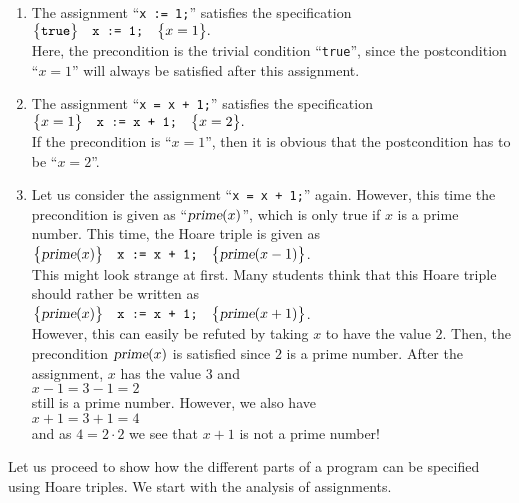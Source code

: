 \examples
\begin{enumerate}
\item The assignment ``\texttt{x := 1;}'' satisfies the specification
      \\[0.2cm]
      \hspace*{1.3cm}
      $ \bigl\{\mathtt{true}\bigr\}\quad\texttt{x := 1;}\quad\bigl\{x = 1\bigr\}. $
      \\[0.2cm]
      Here, the precondition is the trivial condition ``\texttt{true}'', since
      the postcondition ``$x = 1$'' will always be satisfied after this assignment.
\item The assignment  ``\texttt{x = x + 1;}'' satisfies the specification
      \\[0.2cm]
      \hspace*{1.3cm}
      $ \bigl\{x=1\bigr\}\quad\texttt{x := x + 1;}\quad\bigl\{x=2\bigr\}. $
      \\[0.2cm]
      If the precondition is ``$x = 1$'', then it is obvious that the postcondition has to be  
      ``$x = 2$''.
\item Let us consider the assignment ``\texttt{x = x + 1;}'' again.  However, this time
      the precondition is given as ``$\textsl{prime}(x)$'', which is only true if $x$ is a
      prime number.  This time, the Hoare triple is given as
      \\[0.2cm]
      \hspace*{1.3cm}
      $ \bigl\{\textsl{prime}(x)\bigr\}\quad\texttt{x := x + 1;}\quad\bigl\{\textsl{prime}(x-1)\bigr\}$.
      \\[0.2cm]
      This might look strange at first.  Many students think that this Hoare triple should rather
      be written as
      \\[0.2cm]
      \hspace*{1.3cm}
      $ \bigl\{\textsl{prime}(x)\bigr\}\quad\texttt{x := x + 1;}\quad\bigl\{\textsl{prime}(x+1)\bigr\} $.
      \\[0.2cm]
      However, this can easily be refuted by taking $x$ to have the value $2$.  Then, the
      precondition $\textsl{prime}(x)$ is satisfied since $2$ is a prime number.  After the
      assignment, $x$ has the value $3$ and
      \\[0.2cm]
      \hspace*{1.3cm}
      $x - 1 = 3 - 1 = 2$
      \\[0.2cm]
      still is a prime number.  However, we also have
      \\[0.2cm]
      \hspace*{1.3cm}
      $x + 1 = 3 + 1 = 4$ 
      \\[0.2cm]
      and as $4 = 2 \cdot 2$ we see that $x + 1$ is not a prime number!
\end{enumerate}
Let us proceed to show how the different parts of a program can be specified using Hoare triples.
We start with the analysis of assignments.
 
